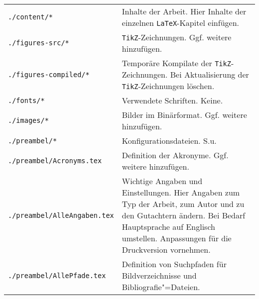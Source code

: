 \begin{longtable}{l@{\extracolsep{8pt}}X}
\texttt{./content/*}                      & Inhalte der Arbeit. Hier Inhalte der einzelnen \texttt{LaTeX}-Kapitel einfügen.\\
\texttt{./figures-src/*}                  & \texttt{TikZ}-Zeichnungen. %
                                          Ggf. weitere hinzufügen.\\
\texttt{./figures-compiled/*}             & Temporäre Kompilate der \texttt{TikZ}-Zeichnungen.
                                          Bei Aktualisierung der \texttt{TikZ}-Zeichnungen löschen.\\
\texttt{./fonts/*}                        & Verwendete Schriften. Keine.\\
\texttt{./images/*}                       & Bilder im Binärformat. %
                                          Ggf. weitere hinzufügen. \\
\texttt{./preambel/*}                     & Konfigurationsdateien. S.u.\\
\texttt{./preambel/Acronyms.tex}          & Definition der Akronyme.
                                          Ggf. weitere hinzufügen.\\
\texttt{./preambel/AlleAngaben.tex}       & Wichtige Angaben und Einstellungen.
                                          Hier Angaben zum Typ der Arbeit, zum Autor und zu den Gutachtern ändern.
                                          Bei Bedarf Hauptsprache auf Englisch umstellen.
                                          Anpassungen für die Druckversion vornehmen.\\
\texttt{./preambel/AllePfade.tex}         & Definition von Suchpfaden für Bildverzeichnisse und Bibliografie"=Dateien.

\end{longtable}
